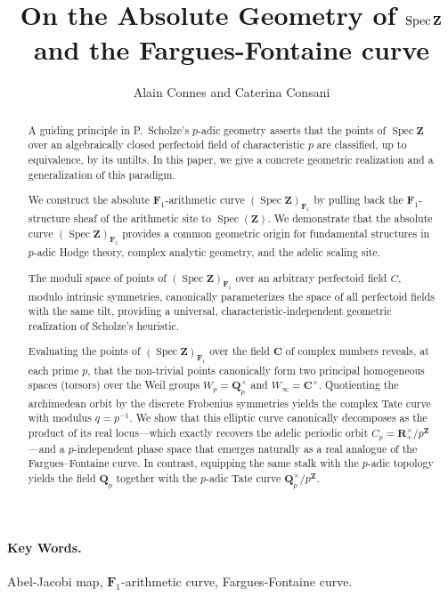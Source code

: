 \documentclass[11pt,a4paper]{article}
\title{On the Absolute Geometry of $\spz$\\[0.3em]
\Large and the Fargues-Fontaine curve}
\author{Alain Connes and Caterina Consani}
\date{}
\newcommand{\C}{\mathbf{C}}
\newcommand{\Q}{\mathbf{Q}}
\newcommand{\R}{\mathbf{R}}
\newcommand{\Z}{\mathbf{Z}}
\newcommand{\Fone}{\mathbf{F}_{1}}
\def\spz{\Spec \Z}
\def\spzf{(\Spec \Z)_{\mathbf{F}_{1}}}
\newcommand{\Spec}{\operatorname{Spec}}
\begin{document}
\maketitle


\begin{abstract}
 \noindent A guiding principle in P.~Scholze’s $p$-adic geometry asserts that the points of $\spz$ over an algebraically closed perfectoid field of characteristic $p$ are classified, up to equivalence, by its untilts. In this paper, we give a concrete geometric realization and a generalization of this paradigm.

 \noindent We construct the absolute $\Fone$-arithmetic curve $\spzf$ by pulling back the $\Fone$-structure sheaf of the arithmetic site to $\operatorname{Spec}(\Z)$. We demonstrate that the absolute curve $\spzf$ provides a common geometric origin for fundamental structures in $p$-adic Hodge theory, complex analytic geometry, and the adelic scaling site.

\noindent The moduli space of points  of  $\spzf$ over an arbitrary perfectoid field $C$, modulo intrinsic symmetries,  canonically parameterizes the space of all perfectoid fields with the same tilt, providing a universal, characteristic-independent geometric realization of Scholze's heuristic. 



 \noindent Evaluating the points of $\spzf$ over the field $\C$ of complex numbers  reveals, at each prime $p$, that the non-trivial points canonically form two principal homogeneous spaces (torsors) over the  Weil groups $W_p=\Q_p^\times$ and $W_\infty=\C^\times$. Quotienting the archimedean orbit  by the discrete Frobenius symmetries yields the complex Tate curve with modulus $q=p^{-1}$. We show that this elliptic curve canonically decomposes as the product of its real locus---which exactly recovers the adelic periodic orbit $C_p=\R_+^\times/p^\Z$---and a $p$-independent phase space that emerges naturally as a real analogue of the Fargues--Fontaine curve. In contrast, equipping the same stalk with the $p$-adic topology yields the field $\Q_p$ together with the $p$-adic Tate curve $\Q_p^\times/p^\Z$.



\end{abstract}



\paragraph{Key Words.}{Abel-Jacobi map,  $\Fone$-arithmetic curve,  Fargues-Fontaine curve.}
\end{document}
